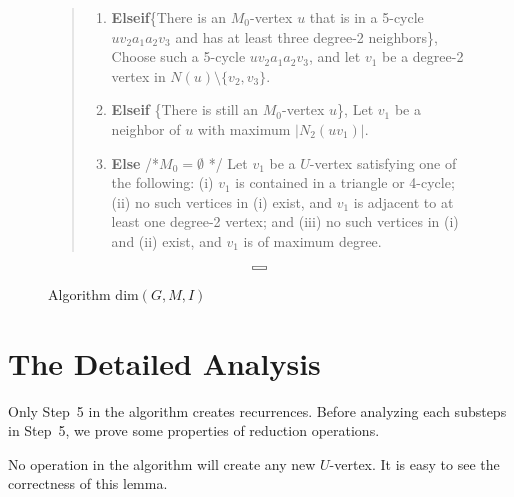 \documentclass{elsart_TR2}
\def\boxit#1{\vbox{\hrule\hbox{\vrule\kern4pt
  \vbox{\kern1pt#1\kern1pt}
\kern2pt\vrule}\hrule}}
\begin{document}
\begin{figure}[!h]
{\begin{quote}
\begin{enumerate}
\begin{enumerate}
Choose such an $M_0$-vertex $u$, and
 let $v_1$ be  a degree-2 neighbor of $u$ with maximum $|N_2(uv_1)|$.
\item
\textbf{Elseif}\{There is an $M_0$-vertex $u$ that is in a 5-cycle $uv_2a_1a_2v_3$
 and  has at least three degree-2  neighbors\},
Choose such a 5-cycle $uv_2a_1a_2v_3$, and let $v_1$ be a degree-2 vertex in $N(u)\setminus\{v_2,v_3\}$.
\item
\textbf{Elseif} \{There is still an $M_0$-vertex $u$\}, Let $v_1$ be a neighbor of $u$ with maximum $|N_2(uv_1)|$.
\item
\textbf{Else} /*$M_0=\emptyset$ */
Let $v_1$ be a $U$-vertex satisfying one of the following: (i) $v_1$ is contained in a triangle or
4-cycle;
(ii) no such vertices in (i) exist, and $v_1$ is adjacent to at least one degree-2
vertex; and (iii) no such vertices in (i) and (ii) exist, and $v_1$ is of maximum degree.


\end{enumerate}
\end{enumerate}

\end{quote} \vspace*{-5mm} \strut}  $$\boxit{\box4}$$ \vspace*{-2mm}
\caption{Algorithm $\mathrm{dim}(G,M,I)$} \label{dim} \vspace{-0mm}
\end{figure}



\section{The Detailed Analysis}\label{sec_analy}


Only Step~5 in the algorithm creates recurrences. Before analyzing each substeps in Step~5,
we prove some properties of reduction operations.




No operation in the algorithm will create any new $U$-vertex. It is easy to see the correctness of this lemma.
\end{document}

